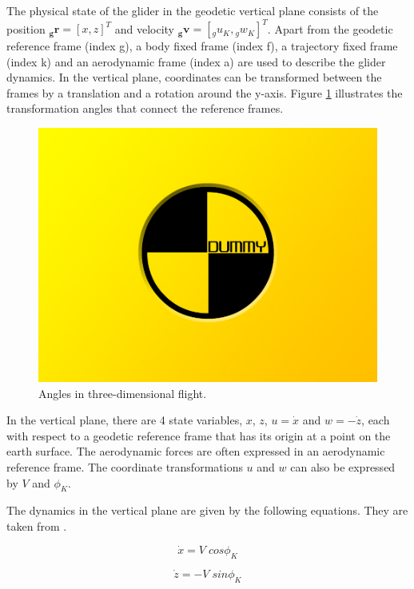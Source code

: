 The physical state of the glider in the geodetic vertical plane consists of the position $\boldsymbol{{}_g r}=[x,z]^T$ and velocity $\boldsymbol{{}_g v}=[{}_g u_K,{}_g w_K]^T$. Apart from the geodetic reference frame (index g), a body fixed frame (index f), a trajectory fixed frame (index k) and an aerodynamic frame (index a) are used to describe the glider dynamics. In the vertical plane, coordinates can be transformed between the frames by a translation and a rotation around the y-axis. Figure \ref{fig:coords2d} illustrates the transformation angles that connect the reference frames. 

\begin{figure}[h]
	\includegraphics[width=\textwidth]{src/pics/dummy.jpg}
	\caption{Angles in three-dimensional flight.}
	\label{fig:coords2d}
\end{figure}

In the vertical plane, there are 4 state variables, $x$, $z$, $u=\dot{x}$ and $w=-\dot{z}$, each with respect to a geodetic reference frame that has its origin at a point on the earth surface. The aerodynamic forces are often expressed in an aerodynamic reference frame. The coordinate transformations $u$ and $w$ can also be expressed by $V$ and $\phi_K$.

The dynamics in the vertical plane are given by the following equations. They are taken from \cite{Fichter2009}. 

\begin{equation}
\dot{x} = V \; cos\phi_K
\end{equation}

\begin{equation}
\dot{z} = - V \; sin\phi_K
\end{equation}

